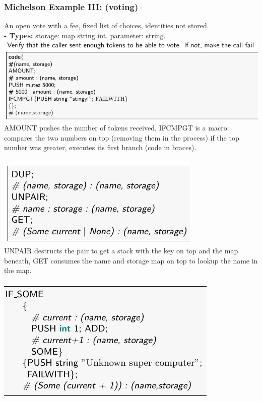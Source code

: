 \documentclass{article}
\begin{document}
\subsubsection{Michelson Example III: (voting)}

An open vote with a fee, fixed list of choices, identities not stored.\\
\textbf{- Types:} storage: map string int. parameter: string.\\
\includegraphics[scale=0.4]{63.png}\\
AMOUNT pushes the number of tokens received, IFCMPGT is a macro: compares the two numbers on top (removing them in the process) if the top number was greater, executes its first branch (code in braces).\\\\
\includegraphics[scale=0.4]{64.png}\\
UNPAIR destructs the pair to get a stack with the key on top and the map beneath, GET consumes the name and storage map on top to lookup the name in the map. \\\\
\includegraphics[scale=0.4]{65.png}\\
\end{document}
